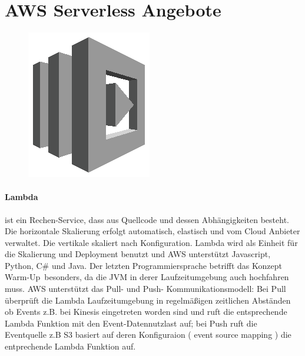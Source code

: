 \documentclass[
12pt,
english,
ngerman,
headsepline,
twoside,
openright,
numbers=noenddot,version=first
]{scrreprt}
\begin{document}
\section{AWS Serverless Angebote}
\begin{figure}
	\includegraphics[width=0.9\linewidth]{./pics/aws/Compute_GRAYSCALE_AWSLambda.eps}
\end{figure}
\paragraph{Lambda} ist ein Rechen-Service, dass aus Quellcode und dessen Abhängigkeiten besteht. Die horizontale Skalierung erfolgt automatisch, elastisch und vom Cloud Anbieter verwaltet. Die vertikale skaliert nach Konfiguration. Lambda wird als Einheit für die Skalierung und Deployment benutzt und \acrshort{AWS} unterstützt Javascript, Python, C\# und Java. Der letzten Programmiersprache betrifft das Konzept \glqq Warm-Up\grqq\ besonders, da die \acrfull{JVM} in derer Laufzeitumgebung auch hochfahren muss. AWS unterstützt das Pull- und Push- Kommunikationsmodell: Bei Pull überprüft die Lambda Laufzeitumgebung in regelmäßigen zeitlichen Abständen ob Events z.B. bei Kinesis eingetreten worden sind und ruft die entsprechende Lambda Funktion mit den Event-Datennutzlast auf; bei Push ruft die Eventquelle z.B S3 basiert auf deren Konfiguraion ( event source mapping ) die entprechende Lambda Funktion auf. 
\end{document}
